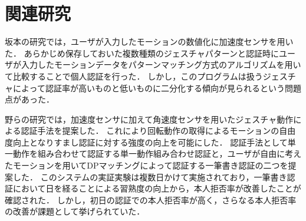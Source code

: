 \section{関連研究}
坂本の研究\cite{sakamoto}では，ユーザが入力したモーションの数値化に加速度センサを用いた．
あらかじめ保存しておいた複数種類のジェスチャパターンと認証時にユーザが入力したモーションデータをパターンマッチング方式のアルゴリズムを用いて比較することで個人認証を行った．
しかし，このプログラムは扱うジェスチャによって認証率が高いものと低いものに二分化する傾向が見られるという問題点があった．

野らの研究\cite{hamano}では，加速度センサに加えて角速度センサを用いたジェスチャ動作による認証手法を提案した．
これにより回転動作の取得によるモーションの自由度向上となりすまし認証に対する強度の向上を可能にした．
認証手法として単一動作を組み合わせて認証する単一動作組み合わせ認証と，ユーザが自由に考えたモーションを用いてDPマッチングによって認証する一筆書き認証の二つを提案した．
このシステムの実証実験は複数日かけて実施されており，一筆書き認証において日を経ることによる習熟度の向上から，本人拒否率が改善したことが確認された．
しかし，初日の認証での本人拒否率が高く，さらなる本人拒否率の改善が課題として挙げられていた．

